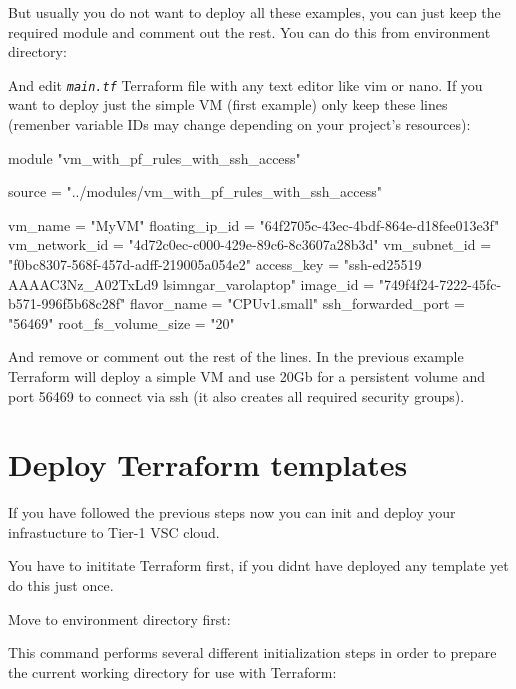 But usually you do not want to deploy all these examples, you can just keep the required module
and comment out the rest. You can do this from environment directory:

\begin{prompt}
\end{prompt}

And edit \texttt{\emph{main.tf}} Terraform file with any text editor like vim or nano.
If you want to deploy just the simple VM (first example) only keep these lines (remenber variable
IDs may change depending on your project's resources):

\begin{code}{}
 module "vm_with_pf_rules_with_ssh_access" {
  source   = "../modules/vm_with_pf_rules_with_ssh_access"

  vm_name              = "MyVM"
  floating_ip_id       = "64f2705c-43ec-4bdf-864e-d18fee013e3f"
  vm_network_id        = "4d72c0ec-c000-429e-89c6-8c3607a28b3d"
  vm_subnet_id         = "f0bc8307-568f-457d-adff-219005a054e2"
  access_key           = "ssh-ed25519 AAAAC3Nz_A02TxLd9 lsimngar_varolaptop"
  image_id             = "749f4f24-7222-45fc-b571-996f5b68c28f"
  flavor_name          = "CPUv1.small"
  ssh_forwarded_port   = "56469"
  root_fs_volume_size  = "20"
}
\end{code}

And remove or comment out the rest of the lines.
In the previous example Terraform will deploy a simple VM and use 20Gb for a persistent volume
and port 56469 to connect via ssh (it also creates all required security groups).

\section{Deploy Terraform templates}\label{sec:deploy-terraform-templates}
If you have followed the previous steps now you can init and deploy your infrastucture to
Tier-1 VSC cloud.

You have to inititate Terraform first, if you didnt have deployed any template yet do this just once.

Move to environment directory first:

\begin{prompt}
\end{prompt}

This command performs several different initialization steps in order to prepare the
current working directory for use with Terraform:


